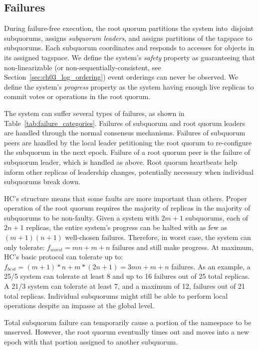 \subsection{Failures}
\label{ch03_failures}

During failure-free execution, the root quorum partitions the system into\ disjoint subquorums, assigns \emph{subquorum leaders}, and assigns partitions of the tagspace to subquorums.
Each subquorum coordinates and responds to accesses for objects in its assigned tagspace.
We define the system's \emph{safety} property as guaranteeing that non-linearizable (or non-sequentially-consistent, see Section~\ref{sec:ch03_log_ordering}) event orderings can never be observed.
We define the system's \emph{progress} property as the system having enough live replicas to commit votes or operations in the root quorum.

The system can suffer several types of failures, as shown in Table~\ref{tab:failure_categories}.
Failures of subquorum and root quorum leaders are handled through the normal consensus mechanisms.
Failures of subquorum peers are handled by the local leader petitioning the root quorum to re-configure the subquorum in the next epoch.
Failure of a root quorum peer is the failure of subquorum leader, which is handled as above.
Root quorum heartbeats help inform other replicas of leadership changes, potentially necessary when individual subquorums break down.


HC's structure means that some faults are more important than others.
Proper operation of the root quorum requires the majority of replicas in the majority of subquorums to be non-faulty.
Given a system with $2m+1$ subquorums, each of $2n+1$ replicas, the entire system's progress can be halted with as few as $(m+1)(n+1)$ well-chosen failures.
Therefore, in worst case, the system can only tolerate: $f_{worst}=mn+m+n$ failures and still make progress.
At maximum, HC's basic protocol can tolerate up to: $f_{best} = (m+1)*n + m*(2n+1) = 3mn+m+n$ failures.
As an example, a 25/5 system can tolerate at least 8 and up to 16 failures out of 25 total replicas.
A 21/3 system can tolerate at least 7, and a maximum of 12, failures out of 21 total replicas.
Individual subquorums might still be able to perform local operations despite an impasse at the global level.

Total subquorum failure can temporarily cause a portion of the namespace to be unserved.
However, the root quorum eventually times out and moves into a new epoch with that portion assigned to another subquorum.

